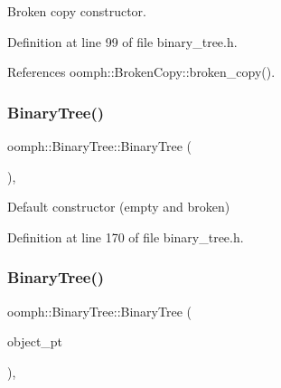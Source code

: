 Broken copy constructor. 



Definition at line 99 of file binary\+\_\+tree.\+h.



References oomph\+::\+Broken\+Copy\+::broken\+\_\+copy().

\mbox{\label{classoomph_1_1BinaryTree_a3ad7c1ba04813b506e2d70a82b45df9c}} 
\subsubsection{\texorpdfstring{Binary\+Tree()}{BinaryTree()}\hspace{0.1cm}{\footnotesize\ttfamily [2/4]}}
{\footnotesize\ttfamily oomph\+::\+Binary\+Tree\+::\+Binary\+Tree (\begin{DoxyParamCaption}{ }\end{DoxyParamCaption})\hspace{0.3cm}{\ttfamily [inline]}, {\ttfamily [protected]}}



Default constructor (empty and broken) 



Definition at line 170 of file binary\+\_\+tree.\+h.

\mbox{\label{classoomph_1_1BinaryTree_a17856140e51fd48c3441d0b48d854152}} 
\subsubsection{\texorpdfstring{Binary\+Tree()}{BinaryTree()}\hspace{0.1cm}{\footnotesize\ttfamily [3/4]}}
{\footnotesize\ttfamily oomph\+::\+Binary\+Tree\+::\+Binary\+Tree (\begin{DoxyParamCaption}\item[{\hyperlink{classoomph_1_1RefineableElement}{Refineable\+Element} $\ast$const \&}]{object\+\_\+pt }\end{DoxyParamCaption})\hspace{0.3cm}{\ttfamily [inline]}, {\ttfamily [protected]}}



